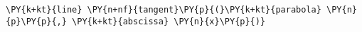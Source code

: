 \begin{Verbatim}[commandchars=\\\{\}]
    \PY{k+kt}{line} \PY{n+nf}{tangent}\PY{p}{(}\PY{k+kt}{parabola} \PY{n}{p}\PY{p}{,} \PY{k+kt}{abscissa} \PY{n}{x}\PY{p}{)}
\end{Verbatim}
